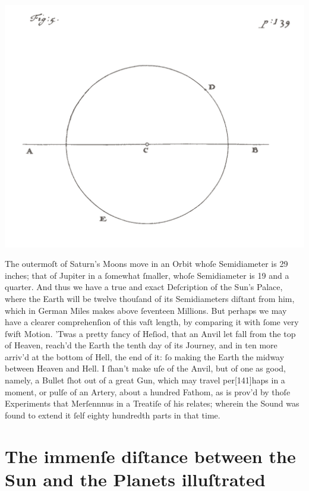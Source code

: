 \documentclass[letterpaper]{book}
\begin{document}
\begin{center}
	\includegraphics[width=.90\textwidth]{Images/ct_5_en.jpg}
\end{center}

The outermoſt of Saturn's Moons move in an Orbit whoſe Semidiameter is
29 inches; that of Jupiter in a ſomewhat ſmaller, whoſe Semidiameter is 19 and
a quarter.  And thus we have a true and exact Deſcription of the Sun's Palace,
where the Earth will be twelve thouſand of its Semidiameters diſtant from him,
which in German Miles makes above ſeventeen Millions. But perhaps we may have a
clearer comprehenſion of this vaſt length, by comparing it with ſome very ſwift
Motion. 'Twas a pretty fancy of Heſiod, that an Anvil let fall from the top of
Heaven, reach'd the Earth the tenth day of its Journey, and in ten more arriv'd
at the bottom of Hell, the end of it: ſo making the Earth the midway between
Heaven and Hell. I ſhan't make uſe of the Anvil, but of one as good, namely, a
Bullet ſhot out of a great Gun, which may travel per[141]haps in a moment, or
pulſe of an Artery, about a hundred Fathom, as is prov'd by thoſe Experiments
that Merſennnus in a Treatiſe of his relates; wherein the Sound was found to
extend it ſelf eighty hundredth parts in that time.


\section{The immenſe diſtance between the Sun and the Planets illuſtrated}
\end{document}
